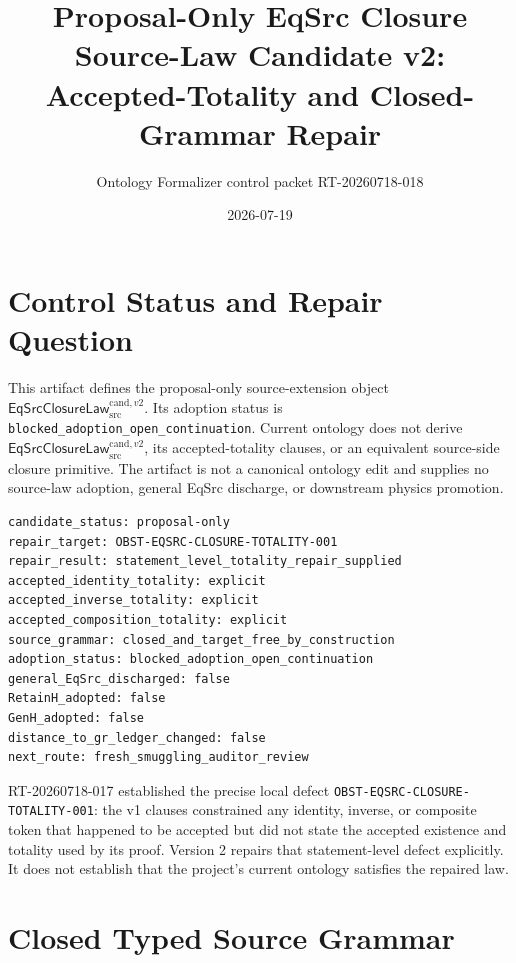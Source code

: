 \documentclass[11pt]{article}
\title{Proposal-Only EqSrc Closure Source-Law Candidate v2:\\
Accepted-Totality and Closed-Grammar Repair}
\author{Ontology Formalizer control packet RT-20260718-018}
\date{2026-07-19}
\newcommand{\Law}{\mathsf{EqSrcClosureLaw}^{\mathrm{cand},v2}_{\mathrm{src}}}
\begin{document}
\maketitle

\section{Control Status and Repair Question}

This artifact defines the proposal-only source-extension object \(\Law\).
Its adoption status is
\texttt{blocked\_adoption\_open\_continuation}. Current ontology does not
derive \(\Law\), its accepted-totality clauses, or an equivalent source-side
closure primitive. The artifact is not a canonical ontology edit and supplies
no source-law adoption, general EqSrc discharge, or downstream physics
promotion.

\begin{verbatim}
candidate_status: proposal-only
repair_target: OBST-EQSRC-CLOSURE-TOTALITY-001
repair_result: statement_level_totality_repair_supplied
accepted_identity_totality: explicit
accepted_inverse_totality: explicit
accepted_composition_totality: explicit
source_grammar: closed_and_target_free_by_construction
adoption_status: blocked_adoption_open_continuation
general_EqSrc_discharged: false
RetainH_adopted: false
GenH_adopted: false
distance_to_gr_ledger_changed: false
next_route: fresh_smuggling_auditor_review
\end{verbatim}

RT-20260718-017 established the precise local defect
\texttt{OBST-EQSRC-CLOSURE-TOTALITY-001}: the v1 clauses constrained any
identity, inverse, or composite token that happened to be accepted but did not
state the accepted existence and totality used by its proof. Version 2 repairs
that statement-level defect explicitly. It does not establish that the
project's current ontology satisfies the repaired law.

\section{Closed Typed Source Grammar}
\end{document}
